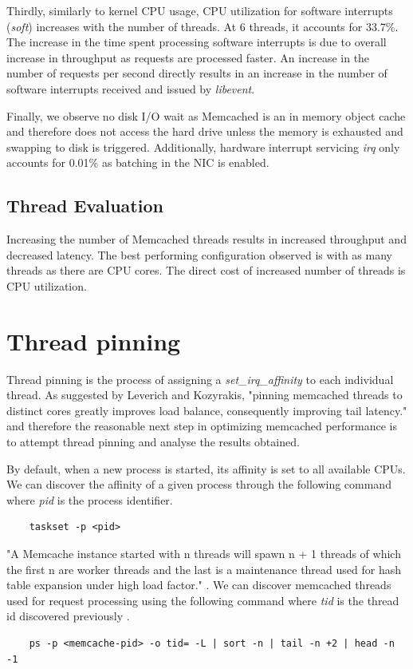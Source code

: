 Thirdly, similarly to kernel CPU usage, CPU utilization for software interrupts (\textit{soft}) increases with the number of threads. At 6 threads, it accounts for 33.7\%. The increase in the time spent processing software interrupts is due to overall increase in throughput as requests are processed faster. An increase in the number of requests per second directly results in an increase in the number of software interrupts received and issued by \textit{libevent}.

Finally, we observe no disk I/O wait as Memcached is an in memory object cache and therefore does not access the hard drive unless the memory is exhausted and swapping to disk is triggered. Additionally, hardware interrupt servicing \textit{irq} only accounts for 0.01\% as batching in the NIC is enabled.


\subsection{Thread Evaluation}
Increasing the number of Memcached threads results in increased throughput and decreased latency. The best performing configuration observed is with as many threads as there are CPU cores. The direct cost of increased number of threads is CPU utilization.


\section{Thread pinning}
\label{sec:thread-pinning}
Thread pinning is the process of assigning a \textit{set\_irq\_affinity} to each individual thread. As suggested by Leverich and Kozyrakis, "pinning memcached threads to distinct cores greatly improves load balance, consequently improving tail latency." \cite{leverich2014reconciling} and therefore the reasonable next step in optimizing memcached performance is to attempt thread pinning and analyse the results obtained.

By default, when a new process is started, its affinity is set to all available CPUs. We can discover the affinity of a given process through the following command where \textit{pid} is the process identifier.

\begin{lstlisting}
    taskset -p <pid>
\end{lstlisting}


"A Memcache instance started with n threads will spawn n + 1 threads of which the first n are worker threads and the last is a maintenance thread used for hash table expansion under high load factor." \cite{solarflarememcached}. We can discover memcached threads used for request processing using the following command where \textit{tid} is the thread id discovered previously \cite{solarflarememcached}.
\begin{lstlisting}
    ps -p <memcache-pid> -o tid= -L | sort -n | tail -n +2 | head -n -1
\end{lstlisting}

